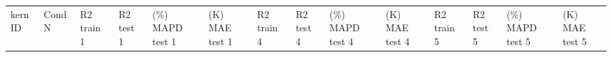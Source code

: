 \documentclass[journal=jacsat,manuscript=article]{achemso}
\begin{document}
\begin{table}[H]
    \centering
    \begin{tabular}{>{\centering\arraybackslash}p{1.0cm}>{\centering\arraybackslash}p{1.0cm}>{\centering\arraybackslash}p{0.75cm}>{\centering\arraybackslash}p{0.75cm}>{\centering\arraybackslash}p{1.0cm}>{\centering\arraybackslash}p{1.0cm}>{\centering\arraybackslash}p{0.75cm}>{\centering\arraybackslash}p{0.75cm}>{\centering\arraybackslash}p{1cm}>{\centering\arraybackslash}p{0.75cm}>{\centering\arraybackslash}p{0.75cm}>{\centering\arraybackslash}p{0.75cm}>{\centering\arraybackslash}p{1cm}>{\centering\arraybackslash}p{0.75cm}}
    \vspace{1.15cm}  kern ID& 
    \vspace{1.15cm} Cond   N& 
    \vspace{0.66cm} R2  train     1&  
    \vspace{0.66cm} R2  test   1& 
    \vspace{0.146cm} (\%) MAPD test \hspace{0.5cm}  1&  
 \vspace{0.146cm} (K) MAE test  \hspace{0.5cm}   1&  \vspace{0.66cm} R2 train   4& \vspace{0.66cm} R2 test   4& \vspace{0.146cm} (\%) MAPD test  \hspace{0.5cm}  4&
 \vspace{0.146cm} (K) MAE test  \hspace{0.5cm}   4&
 \vspace{0.66cm} R2   train      5&
 \vspace{0.66cm} R2   test     5&
 \vspace{0.146cm} (\%) MAPD test  \hspace{0.5cm}   5&
 \vspace{0.146cm} (K) MAE test  \hspace{0.5cm}   5
 


\end{tabular}
\end{table}
\end{document}
